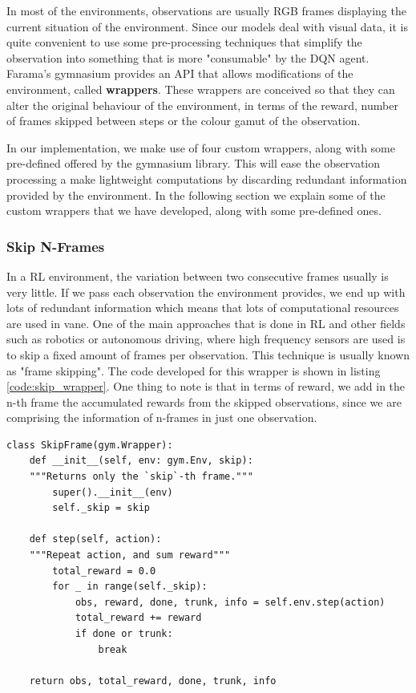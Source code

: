 In most of the environments, observations are usually RGB frames displaying the current situation of the environment. Since our models deal with visual data, it is quite convenient to use some pre-processing techniques that simplify the observation into something that is more "consumable" by the DQN agent. Farama's gymnasium provides an API that allows modifications of the environment, called \textbf{wrappers}. These wrappers are conceived so that they can alter the original behaviour of the environment, in terms of the reward, number of frames skipped between steps or the colour gamut of the observation. 

In our implementation, we make use of four custom wrappers, along with some pre-defined offered by the gymnasium library. This will ease the observation processing a make lightweight computations by discarding redundant information provided by the environment. In the following section we explain some of the custom wrappers that we have developed, along with some pre-defined ones.

\subsubsection{Skip N-Frames}
\label{sec:skip_wrapper}
In a RL environment, the variation between two consecutive frames usually is very little. If we pass each observation the environment provides, we end up with lots of redundant information which means that lots of computational resources are used in vane. One of the main approaches that is done in RL and other fields such as robotics or autonomous driving, where high frequency sensors are used is to skip a fixed amount of frames per observation. This technique is usually known as "frame skipping". The code developed for this wrapper is shown in listing \ref{code:skip_wrapper}. One thing to note is that in terms of reward, we add in the n-th frame the accumulated rewards from the skipped observations, since we are comprising the information of n-frames in just one observation.

\begin{lstlisting}[caption={Frame skip wrapper}, label={code:skip_wrapper}]
class SkipFrame(gym.Wrapper):
	def __init__(self, env: gym.Env, skip):
	"""Returns only the `skip`-th frame."""
		super().__init__(env)
		self._skip = skip
	
	def step(self, action):
	"""Repeat action, and sum reward"""
		total_reward = 0.0
		for _ in range(self._skip):
			obs, reward, done, trunk, info = self.env.step(action)
			total_reward += reward
			if done or trunk:
				break
	
	return obs, total_reward, done, trunk, info

\end{lstlisting}

